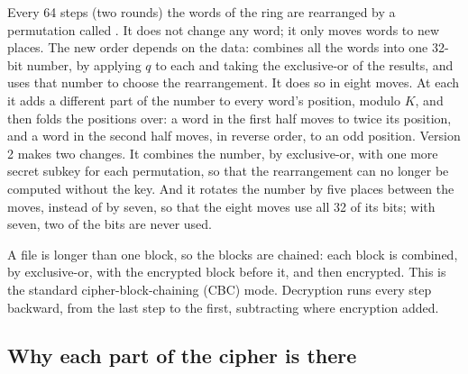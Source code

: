 Every 64 steps (two rounds) the words of the ring are rearranged by a
permutation called . It does not change any word; it only moves
words to new places. The new order depends on the data:  combines
all the words into one 32-bit number, by applying $q$ to each and taking the
exclusive-or of the results, and uses that number to choose the rearrangement.
It does so in eight moves. At each it adds a different part of the number to
every word's position, modulo $K$, and then folds the positions over: a word in
the first half moves to twice its position, and a word in the second half moves,
in reverse order, to an odd position. Version 2 makes two changes. It combines the number, by exclusive-or,
with one more secret subkey for each permutation, so that the rearrangement can
no longer be computed without the key. And it rotates the number by five places
between the moves, instead of by seven, so that the eight moves use all 32 of
its bits; with seven, two of the bits are never used.

A file is longer than one block, so the blocks are chained: each block is
combined, by exclusive-or, with the encrypted block before it, and then
encrypted. This is the standard cipher-block-chaining (CBC) mode. Decryption
runs every step backward, from the last step to the first, subtracting where
encryption added.

\subsection{Why each part of the cipher is there}

